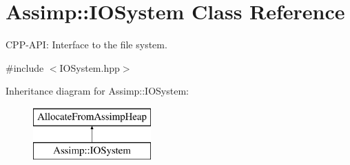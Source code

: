 \hypertarget{class_assimp_1_1_i_o_system}{}\section{Assimp\+:\+:I\+O\+System Class Reference}
\label{class_assimp_1_1_i_o_system}


C\+P\+P-\/\+A\+PI\+: Interface to the file system.  




{\ttfamily \#include $<$I\+O\+System.\+hpp$>$}

Inheritance diagram for Assimp\+:\+:I\+O\+System\+:\begin{figure}[H]
\begin{center}
\leavevmode
\includegraphics[height=2.000000cm]{class_assimp_1_1_i_o_system}
\end{center}
\end{figure}
